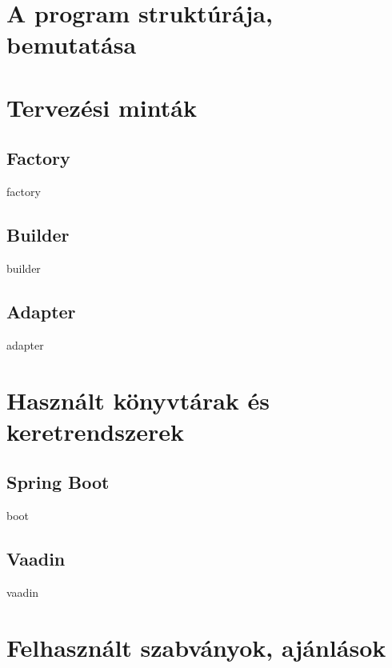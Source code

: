 \section{A program struktúrája, bemutatása}

\section{Tervezési minták}

\subsection{Factory}

factory

\subsection{Builder}

builder

\subsection{Adapter}

adapter



\section{Használt könyvtárak és keretrendszerek}



\subsection{Spring Boot}

boot



\subsection{Vaadin}

vaadin

\section{Felhasznált szabványok, ajánlások}







